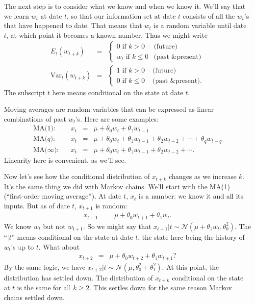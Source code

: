 \documentclass[11pt]{article}
\begin{document}
The next step is to consider what we know and when we know it.
We'll say that we learn $w_t$ at date $t$,
so that our information set at date $t$ consists of all the $w_t$'s that have
happened to date.
That means that $w_t$ is a random variable until date $t$, at which point it becomes
a known number.
Thus we might write
\begin{eqnarray*}
    E_t (w_{t+k}) &=&
            \left\{
            \begin{array}{ll}
            0 \mbox{ if } k > 0  &  \mbox{(future)}\\
            w_t \mbox{ if } k \leq 0 &  \mbox{(past \& present)} 
            \end{array}
            \right. \\
    \mbox{Var}_t (w_{t+k}) &=&
            \left\{
            \begin{array}{ll}
            1 \mbox{ if } k > 0     &  \mbox{ (future)}\\
            0 \mbox{ if } k \leq 0  &  \mbox{ (past \& present)} .
            \end{array}
            \right.
\end{eqnarray*}
The subscript $t$ here means conditional on the state at date $t$.

Moving averages are random variables that can be expressed
as linear combinations of past $w_t$'s.
Here are some examples:
\begin{eqnarray*}
    \mbox{MA(1)}:   &&  x_t \;\;=\;\; \mu + \theta_0 w_t + \theta_1 w_{t-1} \\
    \mbox{MA($q$)}:   &&  x_t \;\;=\;\; \mu + \theta_0 w_t + \theta_1 w_{t-1}
                            + \theta_2 w_{t-2} + \cdots + \theta_q w_{t-q} \\
    \mbox{MA($\infty$)}:   &&  x_t \;\;=\;\; \mu + \theta_0 w_t + \theta_1 w_{t-1}
                            + \theta_2 w_{t-2} + \cdots .
\end{eqnarray*}
Linearity here is convenient, as we'll see.

Now let's see how the conditional distribution of $x_{t+k}$ changes as we increase $k$.
It's the same thing we did with Markov chains.
We'll start with the MA(1) (``first-order moving average'').
At date $t$, $x_t$ is a number:  we know it and all its inputs.
But as of date $t$, $x_{t+1}$ is random:
\begin{eqnarray*}
    x_{t+1} &=& \mu + \theta_0 w_{t+1} + \theta_1 w_{t} .
\end{eqnarray*}
We know $w_t$ but not $w_{t+1}$.
So we might say that $x_{t+1} | t \sim \mathcal{N} (\mu + \theta_1 w_t, \theta_0^2 )$.
The ``$|t$'' means conditional on the state at date $t$,
the state here being the history of $w_t$'s up to $t$.
What about
\begin{eqnarray*}
    x_{t+2} &=& \mu + \theta_0 w_{t+2} + \theta_1 w_{t+1} ?
\end{eqnarray*}
By the same logic, we have
$x_{t+2} | t \sim \mathcal{N} (\mu , \theta_0^2 + \theta_1^2 )$.
At this point, the distribution has settled down.
The distribution of $x_{t+k}$ conditional on the state at $t$
is the same for all $ k\geq 2$.
This settles down for the same reason Markov chains settled down.
\end{document}
